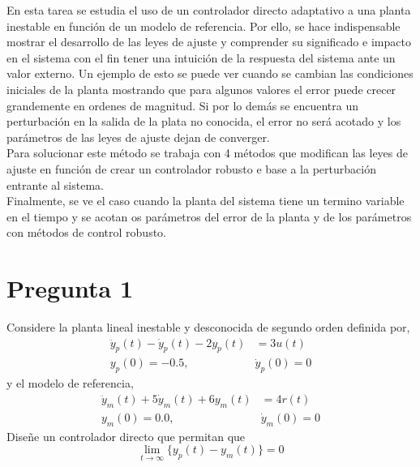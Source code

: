 \documentclass[letterpaper,11pt]{article} %
\begin{document}
	



\begin{resumen}
En esta tarea se estudia el uso de un controlador directo adaptativo a una planta inestable en función de un modelo de referencia. Por ello, se hace indispensable mostrar el desarrollo de las leyes de ajuste y comprender su significado e impacto en el sistema con el fin tener una intuición de la respuesta del sistema ante un valor externo. Un ejemplo de esto se puede ver cuando se cambian las condiciones iniciales de la planta mostrando que para algunos valores el error puede crecer grandemente en ordenes de magnitud. Si por lo demás se encuentra un perturbación en la salida de la plata no conocida, el error no será acotado y los parámetros de las leyes de ajuste dejan de converger.  \\
Para solucionar este método se trabaja con 4 métodos que modifican las leyes de ajuste en función de crear un controlador robusto e base a la perturbación entrante al sistema. \\
Finalmente, se ve el caso cuando la planta del sistema tiene un termino variable en el tiempo y se acotan os parámetros del error de la planta y de los parámetros con métodos de control robusto.
\end{resumen}




\section{Pregunta 1}
Considere la planta lineal inestable y desconocida de segundo orden definida por,
\begin{align}
\ddot{y}_p(t)  - \dot{y}_p(t) - 2 y_p(t) &= 3u(t)\nonumber \\
y_p(0) = -0.5,\ & \dot{y}_p(0) = 0  \nonumber
\end{align}
y el modelo de referencia,
\begin{align}
\ddot{y}_m(t)  + 5\dot{y}_m(t) + 6y_m(t) & = 4r(t)\nonumber \\
y_m(0) = 0.0,\ & \dot{y}_m(0) = 0 \nonumber
\end{align}
Diseñe un controlador directo que permitan que $$\lim_{t\to\infty}\{y_p(t) - y_m(t)\}=0$$
\end{document}
